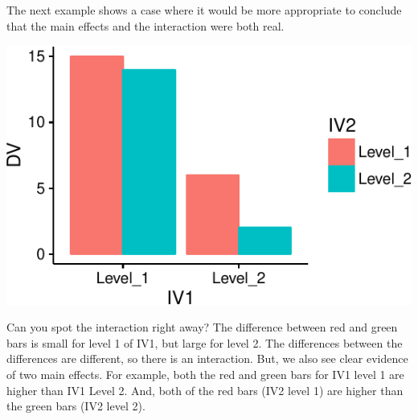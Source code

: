The next example shows a case where it would be more appropriate to
conclude that the main effects and the interaction were both real.

\includegraphics{Factorial_files/figure-latex/unnamed-chunk-16-1}

Can you spot the interaction right away? The difference between red and
green bars is small for level 1 of IV1, but large for level 2. The
differences between the differences are different, so there is an
interaction. But, we also see clear evidence of two main effects. For
example, both the red and green bars for IV1 level 1 are higher than IV1
Level 2. And, both of the red bars (IV2 level 1) are higher than the
green bars (IV2 level 2).



